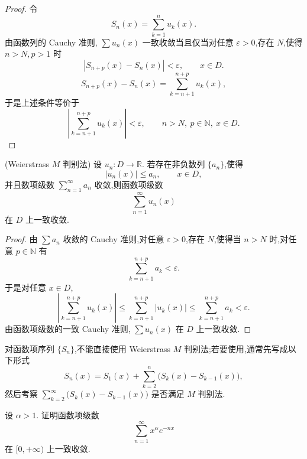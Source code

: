 \begin{proof}
	令
	\[
	S_n(x)=\sum_{k=1}^{n}u_k(x).
	\]
	由函数列的 Cauchy 准则, $\sum u_n(x)$ 一致收敛当且仅当对任意 $\varepsilon>0$,存在 $N$,使得 $n>N,p>1$ 时
	\[
	|S_{n+p}(x)-S_n(x)|<\varepsilon,
	\qquad x\in D.
	\]
	\[
	S_{n+p}(x)-S_n(x)=\sum_{k=n+1}^{n+p}u_k(x),
	\]
	于是上述条件等价于
	\[
	\left|\sum_{k=n+1}^{n+p}u_k(x)\right|<\varepsilon,
	\qquad n>N,\ p\in\mathbb{N},\ x\in D.
	\]
\end{proof}






\begin{theorem}(Weierstrass $M$ 判别法)
	设 $u_n:D\to\mathbb{R}$. 若存在非负数列 $\{a_n\}$,使得
	\[
	|u_n(x)|\leq a_n,
	\qquad x\in D,
	\]
	并且数项级数 $\sum\limits_{n=1}^{\infty}a_n$ 收敛,则函数项级数
	\[
	\sum_{n=1}^{\infty}u_n(x)
	\]
	在 $D$ 上一致收敛. 
\end{theorem}

\begin{proof}
	由 $\sum a_n$ 收敛的 Cauchy 准则,对任意 $\varepsilon>0$,存在 $N$,使得当 $n>N$ 时,对任意 $p\in\mathbb{N}$ 有
	\[
	\sum_{k=n+1}^{n+p}a_k<\varepsilon.
	\]
	于是对任意 $x\in D$,
	\[
	\left|\sum_{k=n+1}^{n+p}u_k(x)\right|
	\leq \sum_{k=n+1}^{n+p}|u_k(x)|
	\leq \sum_{k=n+1}^{n+p}a_k<\varepsilon.
	\]
	由函数项级数的一致 Cauchy 准则, $\sum u_n(x)$ 在 $D$ 上一致收敛. 
\end{proof}

对函数项序列 $\{S_n\}$,不能直接使用 Weierstrass $M$ 判别法;若要使用,通常先写成以下形式
\[
S_n(x)=S_1(x)+\sum_{k=2}^{n}\bigl(S_k(x)-S_{k-1}(x)\bigr),
\]
然后考察 $\sum\limits_{k=2}^{\infty}\bigl(S_k(x)-S_{k-1}(x)\bigr)$ 是否满足 $M$ 判别法.

\begin{problem}
	设 $\alpha>1$. 证明函数项级数
	\[
	\sum_{n=1}^{\infty}x^{\alpha}e^{-nx}
	\]
	在 $[0,+\infty)$ 上一致收敛.
\end{problem}

